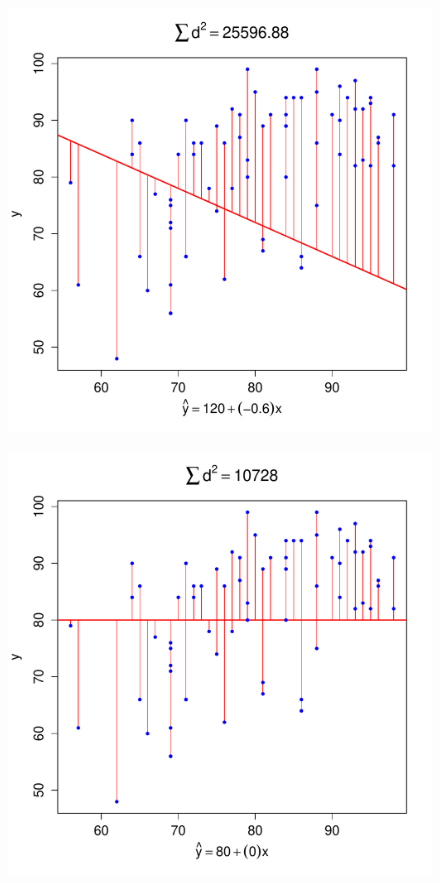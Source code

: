 \documentclass[handout]{beamer}
\begin{document}
%
%
\begin{frame}
\begin{figure}
	\includegraphics[scale = 0.48]{./images/SS1}
\end{figure}
\end{frame}
\begin{frame}
\begin{figure}
	\includegraphics[scale = 0.48]{./images/SS2}
\end{figure}
\end{frame}
\end{document}
